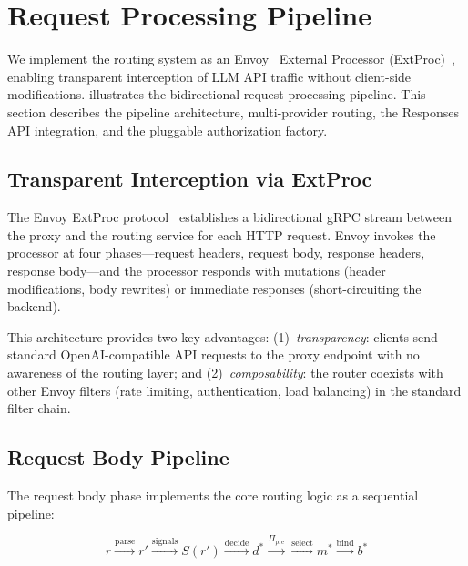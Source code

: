 
\section{Request Processing Pipeline}
\label{sec:extproc}

We implement the routing system as an Envoy~\cite{envoyproxy2024} External Processor (ExtProc)~\cite{envoyextproc2024}, enabling transparent interception of LLM API traffic without client-side modifications.
 illustrates the bidirectional request processing pipeline.
This section describes the pipeline architecture, multi-provider routing, the Responses API integration, and the pluggable authorization factory.

\subsection{Transparent Interception via ExtProc}

The Envoy ExtProc protocol~\cite{envoyextproc2024} establishes a bidirectional gRPC stream between the proxy and the routing service for each HTTP request.
Envoy invokes the processor at four phases---request headers, request body, response headers, response body---and the processor responds with mutations (header modifications, body rewrites) or immediate responses (short-circuiting the backend).

This architecture provides two key advantages:
(1)~\emph{transparency}: clients send standard OpenAI-compatible API requests to the proxy endpoint with no awareness of the routing layer; and
(2)~\emph{composability}: the router coexists with other Envoy filters (rate limiting, authentication, load balancing) in the standard filter chain.

\subsection{Request Body Pipeline}

The request body phase implements the core routing logic as a sequential pipeline:

\begin{equation}
  r \xrightarrow{\text{parse}} r' \xrightarrow{\text{signals}} S(r') \xrightarrow{\text{decide}} d^* \xrightarrow{\Pi_\text{pre}} \xrightarrow{\text{select}} m^* \xrightarrow{\text{bind}} b^*
\end{equation}

